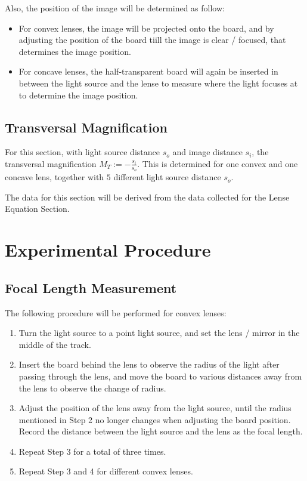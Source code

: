 \documentclass{article}
\begin{document}
Also, the position of the image will be determined as follow:
\begin{itemize}
    \item For convex lenses, the image will be projected onto the board, and by adjusting the position of the board tiill the image is clear / focused, that determines the image position.
    \item For concave lenses, the half-transparent board will again be inserted in between the light source and the lense to measure where the light focuses at to determine the image position.
\end{itemize}

\hfil

\subsection{Transversal Magnification}
For this section, with light source distance $s_o$ and image distance $s_i$, the transversal magnification $M_T := -\frac{s_i}{s_o}$. This is determined for one convex and one concave lens, together with $5$ different light source distance $s_o$.

The data for this section will be derived from the data collected for the Lense Equation Section.

\hfil

\section{Experimental Procedure}
\subsection{Focal Length Measurement}
The following procedure will be performed for convex lenses:
\begin{enumerate}
    \item Turn the light source to a point light source, and set the lens / mirror in the middle of the track.
    \item Insert the board behind the lens to observe the radius of the light after passing through the lens, and move the board to various distances away from the lens to observe the change of radius.
    \item Adjust the position of the lens away from the light source, until the radius mentioned in Step 2 no longer changes when adjusting the board position. Record the distance between the light source and the lens as the focal length.
    \item Repeat Step 3 for a total of three times.
    \item Repeat Step 3 and 4 for different convex lenses.

\end{enumerate}
\end{document}
